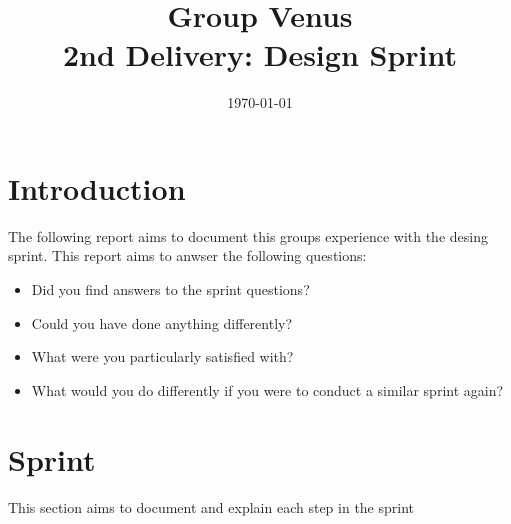 \documentclass[12pt]{article}
\title{\textbf{Group Venus} \\ 2nd Delivery: Design Sprint}
\date{\today}
\begin{document}
\subsectionfont{\fontsize{12}{14}\selectfont}

\maketitle

\tableofcontents

\section{Introduction}
The following report aims to document this groups experience with the desing sprint\cite{DesignSprint2024}.
This report aims to anwser the following questions:
\begin{itemize}
    \item Did you find answers to the sprint questions?
    \item Could you have done anything differently?
    \item What were you particularly satisfied with?
    \item What would you do differently if you were to conduct a similar sprint again?
\end{itemize}

\section{Sprint}
This section aims to document and explain each step in the sprint
\end{document}
